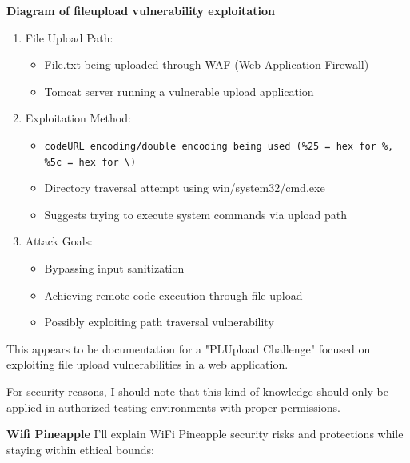 \textbf{Diagram of fileupload vulnerability exploitation}
\begin{enumerate}
  \item File Upload Path:
  \begin{itemize}
    \tightlist
		\item File.txt being uploaded through WAF (Web Application Firewall)
		\item Tomcat server running a vulnerable upload application
  \end{itemize}

  \item Exploitation Method:
  \begin{itemize}
    \tightlist
		\item \lstinline|codeURL encoding/double encoding being used (%25 = hex for %, %5c = hex for \)|
		\item Directory traversal attempt using win/system32/cmd.exe
		\item Suggests trying to execute system commands via upload path
  \end{itemize}

  \item Attack Goals:
  \begin{itemize}
    \tightlist
		\item Bypassing input sanitization
		\item Achieving remote code execution through file upload
		\item Possibly exploiting path traversal vulnerability
  \end{itemize}
\end{enumerate}

This appears to be documentation for a "PLUpload Challenge" focused on exploiting file upload vulnerabilities in a web application.

For security reasons, I should note that this kind of knowledge should only be applied in authorized testing environments with proper permissions.

\textbf{Wifi Pineapple}
I'll explain WiFi Pineapple security risks and protections while staying within ethical bounds:

